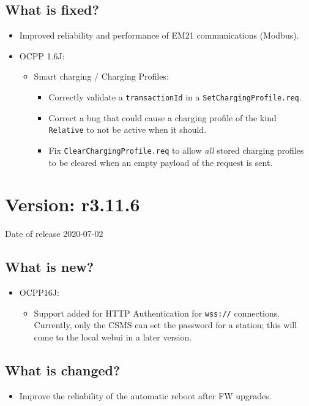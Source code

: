 \documentclass{scrartcl}
\begin{document}
\subsection*{What is fixed?}
\begin{itemize}
\item Improved reliability and performance of EM21 communications (Modbus).
\item OCPP 1.6J:
  \begin{itemize}
  \item Smart charging / Charging Profiles:
    \begin{itemize}
    \item Correctly validate a \verb|transactionId| in a
      \verb|SetChargingProfile.req|.
    \item Correct a bug that could cause a charging profile of the kind
      \verb|Relative| to not be active when it should.
    \item Fix \verb|ClearChargingProfile.req| to allow \emph{all} stored
      charging profiles to be cleared when an empty payload of the request is
      sent.
    \end{itemize}
  \end{itemize}
\end{itemize}

\section{Version: r3.11.6}
Date of release 2020-07-02
\subsection*{What is new?}
\begin{itemize}
\item OCPP16J:
  \begin{itemize}
  \item Support added for HTTP Authentication for \verb|wss://|
    connections. Currently, only the CSMS can set the password for a station;
    this will come to the local webui in a later version.
  \end{itemize}
\end{itemize}
\subsection*{What is changed?}
\begin{itemize}
\item Improve the reliability of the automatic reboot after FW upgrades.
\end{itemize}
\end{document}
